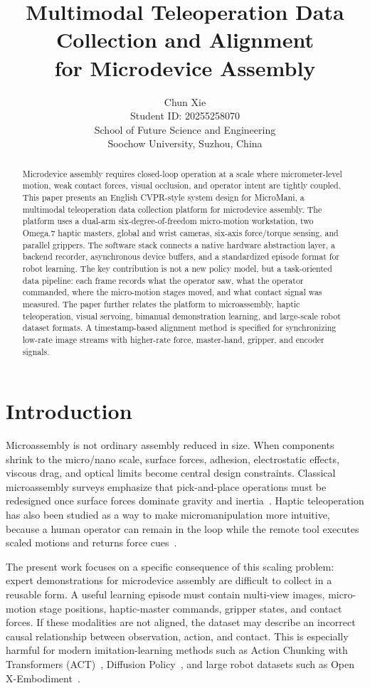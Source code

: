 \documentclass[10pt,twocolumn,letterpaper]{article}
\title{Multimodal Teleoperation Data Collection and Alignment\\for Microdevice Assembly}
\author{Chun Xie\\
Student ID: 20255258070\\
School of Future Science and Engineering\\
Soochow University, Suzhou, China}
\newcommand{\system}{MicroMani}
\begin{document}
\maketitle

\begin{abstract}
Microdevice assembly requires closed-loop operation at a scale where
micrometer-level motion, weak contact forces, visual occlusion, and
operator intent are tightly coupled. This paper presents an English
CVPR-style system design for \system, a multimodal teleoperation data
collection platform for microdevice assembly. The platform uses a
dual-arm six-degree-of-freedom micro-motion workstation, two Omega.7
haptic masters, global and wrist cameras, six-axis force/torque sensing,
and parallel grippers. The software stack connects a native hardware
abstraction layer, a backend recorder, asynchronous device buffers, and
a standardized episode format for robot learning. The key contribution
is not a new policy model, but a task-oriented data pipeline: each frame
records what the operator saw, what the operator commanded, where the
micro-motion stages moved, and what contact signal was measured. The
paper further relates the platform to microassembly, haptic
teleoperation, visual servoing, bimanual demonstration learning, and
large-scale robot dataset formats. A timestamp-based alignment method is
specified for synchronizing low-rate image streams with higher-rate
force, master-hand, gripper, and encoder signals.
\end{abstract}

\section{Introduction}
Microassembly is not ordinary assembly reduced in size. When components
shrink to the micro/nano scale, surface forces, adhesion, electrostatic
effects, viscous drag, and optical limits become central design
constraints. Classical microassembly surveys emphasize that
pick-and-place operations must be redesigned once surface forces dominate
gravity and inertia~\cite{cohn1998microassembly}. Haptic teleoperation
has also been studied as a way to make micromanipulation more intuitive,
because a human operator can remain in the loop while the remote tool
executes scaled motions and returns force cues~\cite{bolopion2013haptic}.

The present work focuses on a specific consequence of this scaling
problem: expert demonstrations for microdevice assembly are difficult to
collect in a reusable form. A useful learning episode must contain
multi-view images, micro-motion stage positions, haptic-master commands,
gripper states, and contact forces. If these modalities are not aligned,
the dataset may describe an incorrect causal relationship between
observation, action, and contact. This is especially harmful for modern
imitation-learning methods such as Action Chunking with Transformers
(ACT)~\cite{zhao2023aloha}, Diffusion Policy~\cite{chi2023diffusion},
and large robot datasets such as Open X-Embodiment~\cite{oneill2024openx}.
\end{document}
